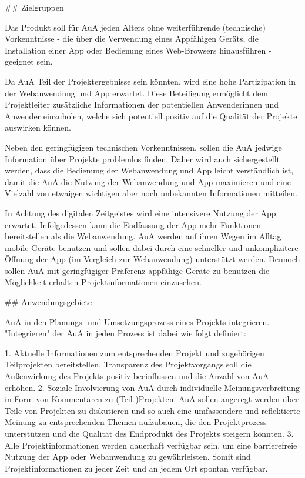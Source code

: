 

\begin{markdown}

## Zielgruppen

Das Produkt soll für AuA jeden Alters ohne weiterführende (technische) Vorkenntnisse - die über die Verwendung eines Appfähigen Geräts, die Installation einer App oder Bedienung eines Web-Browsers hinausführen - geeignet sein.

Da AuA Teil der Projektergebnisse sein könnten, wird eine hohe Partizipation in der Webanwendung und App erwartet. Diese Beteiligung ermöglicht dem Projektleiter zusätzliche Informationen der potentiellen Anwenderinnen und Anwender einzuholen, welche sich potentiell positiv auf die Qualität der Projekte auswirken können.

Neben den geringfügigen technischen Vorkenntnissen, sollen die AuA jedwige Information über Projekte problemlos finden. Daher wird auch sichergestellt werden, dass die Bedienung der Webanwendung und App leicht verständlich ist, damit die AuA die Nutzung der Webanwendung und App maximieren und eine Vielzahl von etwaigen wichtigen aber noch unbekannten Informationen mitteilen.

In Achtung des digitalen Zeitgeistes wird eine intensivere Nutzung der App erwartet. Infolgedessen kann die Endfassung der App mehr Funktionen bereitstellen als die Webanwendung. AuA werden auf ihren Wegen im Alltag mobile Geräte benutzen und sollen dabei durch eine schneller und unkomplizitere Öffnung der App (im Vergleich zur Webanwendung) unterstützt werden. Dennoch sollen AuA mit geringfügiger Präferenz appfähige Geräte zu benutzen die Möglichkeit erhalten Projektinformationen einzusehen.
\end{markdown}
\newpage

\begin{markdown}
## Anwendungsgebiete

AuA in den Planungs- und Umsetzungsprozess eines Projekts integrieren. "Integrieren" der AuA in jeden Prozess ist dabei wie folgt definiert:

1. Aktuelle Informationen zum entsprechenden Projekt und zugehörigen Teilprojekten bereitstellen. Transparenz des Projektvorgangs soll die Außenwirkung des Projekts positiv beeinflussen und die Anzahl von AuA erhöhen.
2. Soziale Involvierung von AuA durch individuelle Meinungsverbreitung in Form von Kommentaren zu (Teil-)Projekten. AuA sollen angeregt werden über Teile von Projekten zu diskutieren und so auch eine umfassendere und reflektierte Meinung zu entsprechenden Themen aufzubauen, die den Projektprozess unterstützen und die Qualität des Endprodukt des Projekts steigern könnten.
3. Alle Projektinformationen werden dauerhaft verfügbar sein, um eine barrierefreie Nutzung der App oder Webanwendung zu gewährleisten. Somit sind Projektinformationen zu jeder Zeit und an jedem Ort spontan verfügbar.
\end{markdown}
